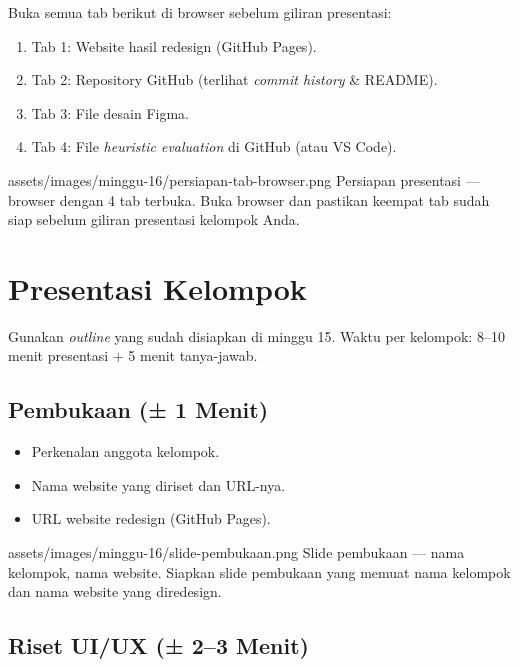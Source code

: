 Buka semua tab berikut di browser sebelum giliran presentasi:
\begin{enumerate}
  \item Tab 1: Website hasil redesign (GitHub Pages).
  \item Tab 2: Repository GitHub (terlihat \emph{commit history} \& README).
  \item Tab 3: File desain Figma.
  \item Tab 4: File \emph{heuristic evaluation} di GitHub (atau VS Code).
\end{enumerate}

\begin{tangkapanlayar}
  {assets/images/minggu-16/persiapan-tab-browser.png}
  {Persiapan presentasi --- browser dengan 4 tab terbuka.}
  {Buka browser dan pastikan keempat tab sudah siap sebelum giliran presentasi kelompok Anda.}
\end{tangkapanlayar}

\section{Presentasi Kelompok}
\label{sec:presentasi}

Gunakan \emph{outline} yang sudah disiapkan di minggu 15. Waktu per kelompok: 8--10 menit presentasi + 5 menit tanya-jawab.

\subsection{Pembukaan (± 1 Menit)}
\label{subsec:pembukaan}

\begin{itemize}
  \item Perkenalan anggota kelompok.
  \item Nama website yang diriset dan URL-nya.
  \item URL website redesign (GitHub Pages).
\end{itemize}

\begin{tangkapanlayar}
  {assets/images/minggu-16/slide-pembukaan.png}
  {Slide pembukaan --- nama kelompok, nama website.}
  {Siapkan slide pembukaan yang memuat nama kelompok dan nama website yang diredesign.}
\end{tangkapanlayar}

\subsection{Riset UI/UX (± 2--3 Menit)}
\label{subsec:presentasi-riset}

